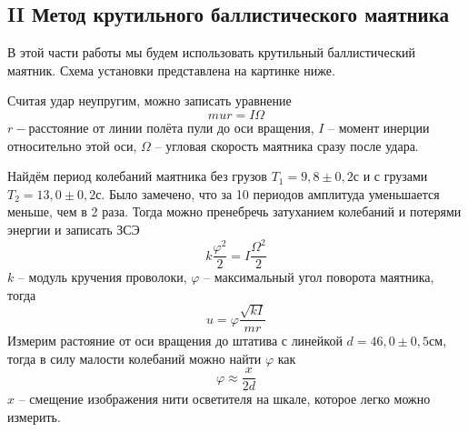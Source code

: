 \documentclass[a4paper, 12pt]{article}
\begin{document}
		\subsection*{II Метод крутильного баллистического маятника}
			В этой части работы мы будем использовать крутильный баллистический маятник. Схема установки представлена на картинке ниже.
			\begin{figure}[h]
			\end{figure}
		
			Считая удар неупругим, можно записать уравнение
			$$mur=I \Omega$$
			$r-$расстояние от линии полёта пули до оси вращения, $I$ -- момент инерции относительно этой оси, $\Omega$ -- угловая скорость маятника сразу после удара.
			
			Найдём период колебаний маятника без грузов $T_1 = 9,8 \pm 0,2 с$ и с грузами $T_2 = 13,0 \pm 0,2 с$. Было замечено, что за 10 периодов амплитуда уменьшается меньше, чем в 2 раза. Тогда можно пренебречь затуханием колебаний и потерями энергии и записать ЗСЭ
			$$ k \frac{\varphi^2}{2} = I \frac{\Omega^2}{2} $$
			$k$ -- модуль кручения проволоки, $\varphi$ -- максимальный угол поворота маятника, тогда
			$$ u = \varphi \frac{\sqrt{kI}}{mr} $$
			Измерим растояние от оси вращения до штатива с линейкой $d = 46,0 \pm 0,5 см$, тогда в силу малости колебаний можно найти $\varphi$ как
			$$\varphi \approx \frac{x}{2d}$$
			$x$ -- смещение изображения нити осветителя на шкале, которое легко можно измерить.
			
\end{document}
